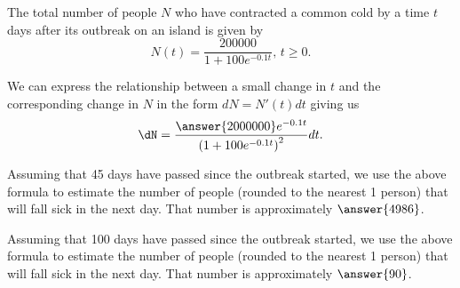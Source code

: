 \documentclass{ximera}
\author{Nela Lakos \and Kyle Parsons}
\begin{document}
\begin{exercise}

The total number of people $N$ who have contracted a common cold by a time $t$ days after its outbreak on an island is given by
\[
N(t) = \frac{200000}{1+100e^{-0.1t}},\,t\geq0.
\]

We can express the relationship between a small change in $t$ and the corresponding change in $N$ in the form $dN = N'(t)dt$ giving us
\[
\dN = \frac{\answer{2000000}e^{-0.1t}}{\left(1+100e^{-0.1t}\right)^2}dt.
\]

Assuming that 45 days have passed since the outbreak started, we use the above formula to estimate the number of people (rounded to the nearest 1 person) that will fall sick in the next day. That number is approximately $\answer{4986}$.

Assuming that 100 days have passed since the outbreak started, we use the above formula to estimate the number of people (rounded to the nearest 1 person) that will fall sick in the next day. That number is approximately $\answer{90}$.

\end{exercise}
\end{document}
